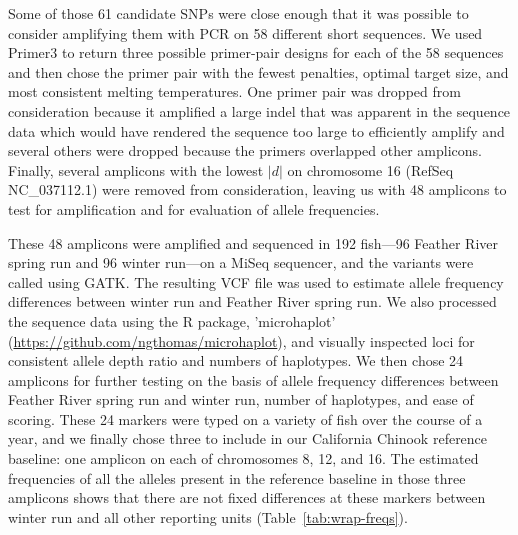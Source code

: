 Some of those 61 candidate SNPs were close enough that it was possible to consider amplifying them
with PCR on 58 different short sequences.  We used Primer3 \citep{untergasser2012primer3} to return
three possible primer-pair designs for each of the 58 sequences and then chose the primer pair
with the fewest penalties, optimal target size, and most consistent
melting temperatures.  One primer pair was dropped from consideration because it
amplified a large indel that was apparent in the sequence data which would have rendered
the sequence too large to efficiently amplify and several others were dropped because the primers
overlapped other amplicons.  Finally, several amplicons with the lowest $|d|$ on chromosome 16
(RefSeq NC\_037112.1) were removed from consideration, leaving us with 48 amplicons to test
for amplification and for evaluation of allele frequencies.

These 48 amplicons were amplified and sequenced in 192 fish---96 Feather River spring run
and 96 winter run---on a MiSeq sequencer, and the variants were called using
GATK.  The resulting VCF file was used to estimate allele frequency differences between
winter run and Feather River spring run.  We also processed the sequence data using
the R package,
'microhaplot' (\url{https://github.com/ngthomas/microhaplot}), and visually inspected
loci for consistent allele depth ratio and numbers of haplotypes.  We then chose 24 amplicons for further
testing on the basis of allele frequency differences between Feather River spring run and
winter run, number of haplotypes, and ease of scoring.  These 24 markers were typed on
a variety of fish over the course of a year, and we finally chose three to include in
our California Chinook reference baseline: one amplicon on each of chromosomes
8, 12, and 16.  The estimated frequencies of all the alleles present in the reference baseline
in those three amplicons shows that there are not fixed differences at these markers between
winter run and all other reporting units (Table~\ref{tab:wrap-freqs}).


